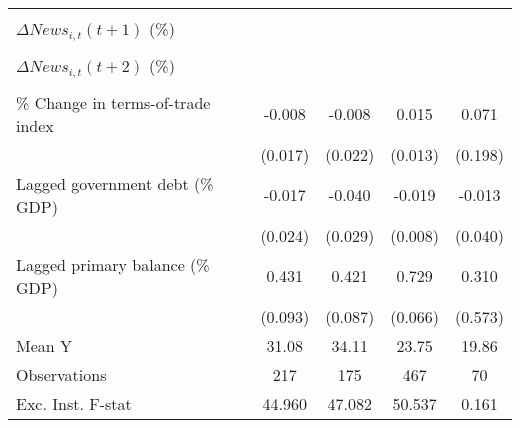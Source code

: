 {\begin{tabular}{l*{4}{c}}
                    &                     &                     &                     &                     \\
\addlinespace
$ \Delta News_{i,t}(t+1)$ (\%)&                     &                     &                     &                     \\
                    &                     &                     &                     &                     \\
\addlinespace
$ \Delta News_{i,t}(t+2)$ (\%)&                     &                     &                     &                     \\
                    &                     &                     &                     &                     \\
\addlinespace
\% Change in terms-of-trade index&      -0.008         &      -0.008         &       0.015         &       0.071         \\
                    &     (0.017)         &     (0.022)         &     (0.013)         &     (0.198)         \\
\addlinespace
Lagged government debt (\% GDP)&      -0.017         &      -0.040         &      -0.019\sym{**} &      -0.013         \\
                    &     (0.024)         &     (0.029)         &     (0.008)         &     (0.040)         \\
\addlinespace
Lagged primary balance (\% GDP)&       0.431\sym{***}&       0.421\sym{***}&       0.729\sym{***}&       0.310         \\
                    &     (0.093)         &     (0.087)         &     (0.066)         &     (0.573)         \\
\midrule
Mean Y              &       31.08         &       34.11         &       23.75         &       19.86         \\
Observations        &         217         &         175         &         467         &          70         \\
Exc. Inst. F-stat   &      44.960         &      47.082         &      50.537         &       0.161         \\
\bottomrule
\end{tabular}
}
